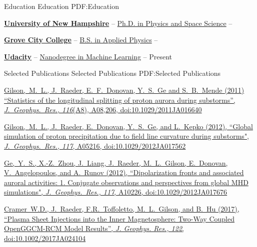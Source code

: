 \documentclass[letterpaper,MMMyyyy,nonstopmode]{simpleresumecv}
\begin{document}
\begin{Body}

\Section
{Education}
{Education}
{PDF:Education}

\Entry
\href{http://www.unh.edu/}
{\textbf{University of New Hampshire}}
--
\href{http://physics.unh.edu/content/physics-phd}
{Ph.D. in Physics  and Space Science}
\hfill
{} --

\BigGap
\Entry
\href{http://www.gcc.edu/Pages/Grove-City-College.aspx}
{\textbf{Grove City College}}
--
\href{http://www.gcc.edu/academics/SEM/physics/Pages/default.aspx}
{B.S. in Applied Physics}
\hfill
{} -- 

\BigGap
\Entry
\href{https://www.udacity.com}
{\textbf{Udacity}}
--
\href{https://www.udacity.com/course/machine-learning-engineer-nanodegree--nd009}
{Nanodegree in Machine Learning}
\hfill
{} -- Present



\Section
{Selected Publications}
{Selected Publications}
{PDF:Selected Publications}
\begin{Detail}
\BigGap
\href{http://onlinelibrary.wiley.com/doi/10.1029/2011JA016640/abstract}
{\underline{Gilson,~M.~L.}, J.~Raeder, E.~F.~Donovan, Y.~S.~Ge and S.~B.~Mende (2011)
``Statistics of the longitudinal splitting of proton aurora during substorms'',
\textit{J.~Geophys.~Res., 116}(A8), A08,206, doi:10.1029/2011JA016640}

\BigGap
\href{http://onlinelibrary.wiley.com/doi/10.1029/2012JA017562/full}
{\underline{Gilson,~M.~L.}, J.~Raeder, E.~Donovan, Y.~S.~Ge, and L.~Kepko (2012), ``Global simulation of proton precipitation due to field line curvature during substorms",
\textit{J.~Geophys.~Res., 117}, A05216, doi:10.1029/2012JA017562}

\BigGap
\href{http://onlinelibrary.wiley.com/doi/10.1029/2012JA017676/abstract}{Ge,~Y.~S., X.-Z.~Zhou, J.~Liang, J.~Raeder, \underline{M.~L.~Gilson}, E.~Donovan, V.~Angelopoulos, and A.~Runov (2012), ``Dipolarization fronts and associated auroral activities: 1. Conjugate observations and perspectives from global MHD simulations", \textit{J.~Geophys.~Res., 117}, A10226, doi:10.1029/2012JA017676}

\BigGap
\href{http://onlinelibrary.wiley.com/doi/10.1002/2017JA024104/full}
{Cramer~W.D., J.~Raeder, F.R.~Toffoletto, \underline{M.~L.~Gilson}, and B.~Hu (2017), ``Plasma Sheet Injections into the Inner Magnetosphere: Two-Way Coupled OpenGGCM-RCM Model Results'',
\textit{J. Geophys. Res., 122}, doi:10.1002/2017JA024104}
\end{Detail}
\end{Body}
\end{document}
